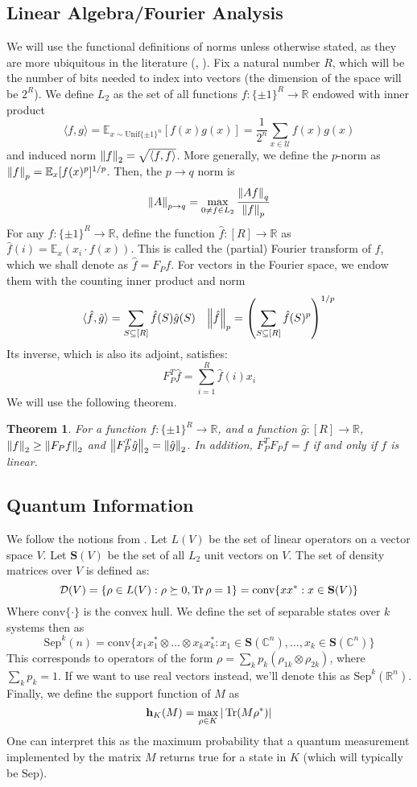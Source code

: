 \documentclass[10pt]{article}
\newcommand{\conv}{\textrm{conv}}
\newcommand{\Sep}{\textrm{Sep}}
\newcommand{\C}{\mathbb{C}}
\newcommand{\R}{\mathbb{R}}
\newcommand{\E}{\mathbb{E}}
\newcommand{\mbf}[1]{\mathbf{ #1 }}
\newtheorem{theorem}{Theorem}
\begin{document}
\subsection{Linear Algebra/Fourier Analysis}
We will use the functional definitions of norms unless otherwise stated, as they are more ubiquitous in the literature (\cite{Barak}, \cite{pqalmost}). Fix a natural number $R$, which will be the number of bits needed to index into vectors (the dimension of the space will be $2^R$). We define $L_2$ as the set of all functions $f: \{\pm 1\}^R \to \R$ endowed with inner product 
\[ \langle f, g \rangle = \mathbb{E}_{x \sim \textrm{Unif}\{\pm 1\}^n} [f(x) g(x)] = \frac{1}{2^n} \sum_{x \in \mathcal{U}} f(x) g(x) \]
and induced norm $\norm{f}_2 = \sqrt{\langle f, f \rangle}$. More generally, we define the $p$-norm as $\norm{f}_p = \mathbb{E}_{x}[f(x)^p]^{1/p}$. Then, the $p\to q$ norm is
\[ \norm{A}_{p \to q} = \max_{0 \neq f \in L_2} \frac{\norm{Af}_q}{\norm{f}_p}\]
For any $f: \{\pm 1\}^R \to \R$, define the function $\hat{f}: [R] \to \R$ as $\hat{f}(i) = \E_x(x_i \cdot f(x))$. This is called the (partial) Fourier transform of $f$, which we shall denote as $\hat{f} = F_P f$.
For vectors in the Fourier space, we endow them with the counting inner product and norm
\begin{align*} \langle \hat{f}, \hat{g} \rangle = \sum_{S \subseteq [R]} \hat{f}(S) \hat{g}(S) && \norm{\hat{f}}_p = \qty(\sum_{S \subseteq [R]} \hat{f}(S)^p)^{1/p}\end{align*}
Its inverse, which is also its adjoint, satisfies:
\[ F_P^T \hat{f} = \sum_{i = 1}^R \hat{f}(i) x_i \]
We will use the following theorem.
\begin{theorem}
    For a function $f: \{\pm 1\}^R \to \R$, and a function $\hat{g}: [R] \to \R$,
    $\norm{f}_2 \geq \norm{F_P f}_2$ and $ \norm{F_P^T \hat{g}}_2 = \norm{\hat{g}}_2$.
    In addition, $F_P^T F_P f = f$ if and only if $f$ is linear.
\end{theorem}

\subsection{Quantum Information}
We follow the notions from \cite{Barak}.
Let $L(V)$ be the set of linear operators on a vector space $V$. Let $\mbf{S}(V)$ be the set of all $L_2$ unit vectors on $V$. The set of density matrices over $V$ is defined as:
\[ \mathcal{D}(V) = \{ \rho \in L(V) : \rho \succeq 0, \Tr \rho = 1\} = \conv\{x x^* : x \in \mbf{S}(V)\}\]
Where $\conv\{\cdot\}$ is the convex hull. We define the set of separable states over $k$ systems then as
\[ \textrm{Sep}^k(n) = \textrm{conv}\{ x_1 x_1^* \otimes \dots \otimes x_k x_k^* : x_1 \in \mbf{S}(\C^n), \dots, x_k \in \mbf{S}(\C^n) \} \]
This corresponds to operators of the form $\rho = \sum_k p_k (\rho_{1k} \otimes \rho_{2k})$, where $\sum_k p_k = 1$. If we 
want to use real vectors instead, we'll denote this as $\Sep^k(\R^n)$. Finally, we define the support function of $M$ as
\[ \mathbf{h}_{K}(M) = \max_{\rho \in K} |\Tr (M \rho^*)| \]
One can interpret this as the maximum probability that a quantum measurement implemented by the matrix $M$ returns true for a state in $K$ (which will typically be $\Sep$).
\end{document}
